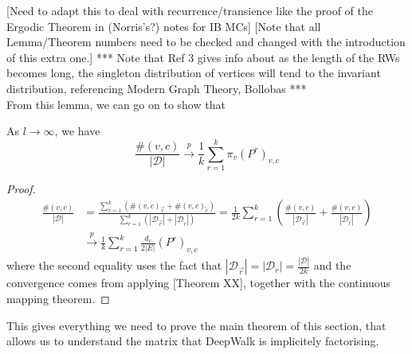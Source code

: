 \documentclass[a4paper]{article}
\newcommand{\D}{\mathcal D}
\newcommand{\rar}{\overrightarrow r}
\newcommand{\lar}{\overleftarrow r}
\begin{document}
[Need to adapt this to deal with recurrence/transience like the proof of the Ergodic Theorem in (Norris's?) notes for IB MCs]
[Note that all Lemma/Theorem numbers need to be checked and changed with the introduction of this extra one.]
*** Note that Ref 3 gives info about as the length of the RWs becomes long, the
singleton distribution of vertices will tend to the invariant distribution,
referencing Modern Graph Theory, Bollobas ***\\
From this lemma, we can go on to show that
\begin{lemma}
  As $l \to \infty$, we have
  \[\frac{\#(v, c)}{|\D|} \overset{p}{\longrightarrow} \frac{1}{k} \sum_{r = 1}^k \pi_v
    (P^r)_{v,c}\]
\end{lemma}
\begin{proof}
  \begin{align*}
    \frac{\#(v, c)}{|\D|} &=  \frac{\sum_{r=1}^k (\#(v, c)_{\rar} + \#(v, c)_{\lar})}{\sum_{r=1}^k (|\D_{\rar}| + |\D_{\lar}|)} = \frac{1}{2k} \sum_{r=1}^k \left( \frac{\#(v, c)}{|\D_{\rar}|} + \frac{\#(v, c)}{|\D_{\lar}|} \right)\\
                          &\overset{p}{\longrightarrow} \frac{1}{k}\sum_{r=1}^{k} \frac{d_v}{2|E|}(P^r)_{v, c}
  \end{align*}
  where the second equality uses the fact that $|\D_{\rar}| = |\D_{\lar}| =
  \frac{|\D|}{2k}$ and the convergence comes from applying [Theorem XX],
  together with the continuous mapping theorem.
\end{proof}
This gives everything we need to prove the main theorem of this section, that
allows us to understand the matrix that DeepWalk is implicitely factorising.
\MainDeepWalk*
\end{document}
